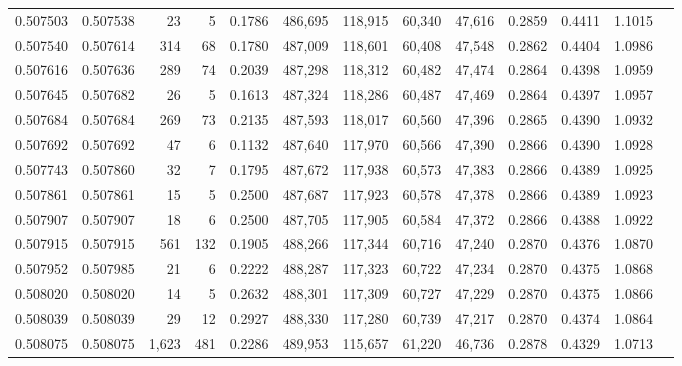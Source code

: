 \begin{tabular}{rrrrrrrrrrrrr}
0.507503 & 0.507538 &    23 &     5 &                                     0.1786 & 486,695 & 118,915 &  60,340 &  47,616 & 0.2859 & 0.4411 & 1.1015 \\
0.507540 & 0.507614 &   314 &    68 &                                     0.1780 & 487,009 & 118,601 &  60,408 &  47,548 & 0.2862 & 0.4404 & 1.0986 \\
0.507616 & 0.507636 &   289 &    74 &                                     0.2039 & 487,298 & 118,312 &  60,482 &  47,474 & 0.2864 & 0.4398 & 1.0959 \\
0.507645 & 0.507682 &    26 &     5 &                                     0.1613 & 487,324 & 118,286 &  60,487 &  47,469 & 0.2864 & 0.4397 & 1.0957 \\
0.507684 & 0.507684 &   269 &    73 &                                     0.2135 & 487,593 & 118,017 &  60,560 &  47,396 & 0.2865 & 0.4390 & 1.0932 \\
0.507692 & 0.507692 &    47 &     6 &                                     0.1132 & 487,640 & 117,970 &  60,566 &  47,390 & 0.2866 & 0.4390 & 1.0928 \\
0.507743 & 0.507860 &    32 &     7 &                                     0.1795 & 487,672 & 117,938 &  60,573 &  47,383 & 0.2866 & 0.4389 & 1.0925 \\
0.507861 & 0.507861 &    15 &     5 &                                     0.2500 & 487,687 & 117,923 &  60,578 &  47,378 & 0.2866 & 0.4389 & 1.0923 \\
0.507907 & 0.507907 &    18 &     6 &                                     0.2500 & 487,705 & 117,905 &  60,584 &  47,372 & 0.2866 & 0.4388 & 1.0922 \\
0.507915 & 0.507915 &   561 &   132 &                                     0.1905 & 488,266 & 117,344 &  60,716 &  47,240 & 0.2870 & 0.4376 & 1.0870 \\
0.507952 & 0.507985 &    21 &     6 &                                     0.2222 & 488,287 & 117,323 &  60,722 &  47,234 & 0.2870 & 0.4375 & 1.0868 \\
0.508020 & 0.508020 &    14 &     5 &                                     0.2632 & 488,301 & 117,309 &  60,727 &  47,229 & 0.2870 & 0.4375 & 1.0866 \\
0.508039 & 0.508039 &    29 &    12 &                                     0.2927 & 488,330 & 117,280 &  60,739 &  47,217 & 0.2870 & 0.4374 & 1.0864 \\
0.508075 & 0.508075 & 1,623 &   481 &                                     0.2286 & 489,953 & 115,657 &  61,220 &  46,736 & 0.2878 & 0.4329 & 1.0713 \\

\end{tabular}
